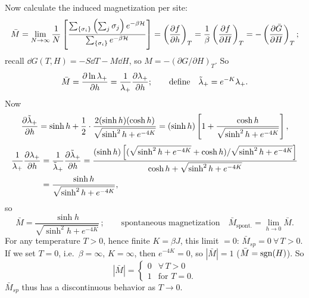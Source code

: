 Now calculate the induced magnetization per site:
\begin{equation}
  \bar M = \lim_{N\to\infty}\frac{1}{N}\left[\frac{\sum_{\{\sigma_i\}}\left(\sum_j\sigma_j\right)e^{-\beta\mathcal{H}}}{\sum_{\{\sigma_i\}}e^{-\beta\mathcal{H}}}\right]
  = \left(\frac{\partial f}{\partial h}\right)_T = \frac{1}{\beta}\left(\frac{\partial f}{\partial H}\right)_T = -\left(\frac{\partial \bar G}{\partial H}\right)_T ;
\end{equation}
recall $\dd G(T,H) = -S\dd T - M\dd H$, so $M = -(\partial G/\partial H)_T$. So
\begin{equation}
  \bar M = \frac{\partial \ln\lambda_+}{\partial h} = \frac{1}{\lambda_+}\frac{\partial \lambda_+}{\partial h};
  \qquad\text{define}\quad \tilde\lambda_+ = e^{-K}\lambda_+ .
\end{equation}
Now
\begin{equation}
  \frac{\partial \tilde\lambda_+}{\partial h} = \sinh h + \frac{1}{2}\cdot\frac{2(\sinh h)(\cosh h)}{\sqrt{\sinh^2h+e^{-4K}}}
  = (\sinh h)\left[1 + \frac{\cosh h}{\sqrt{\sinh^2h+e^{-4K}}}\right],
\end{equation}
\begin{align}
  \frac{1}{\lambda_+}\frac{\partial \lambda_+}{\partial h} &= \frac{1}{\tilde\lambda_+}\frac{\partial \tilde\lambda_+}{\partial h}
  = \frac{(\sinh h)\left[(\sqrt{\sinh^2h+e^{-4K}}+\cosh h)/\sqrt{\sinh^2h+e^{-4K}}\right]}{\cosh h+\sqrt{\sinh^2h+e^{-4K}}}\nonumber\\
  &= \frac{\sinh h}{\sqrt{\sinh^2h+e^{-4K}}},
\end{align}
so
\begin{equation}
  \boxed{\bar M = \frac{\sinh h}{\sqrt{\sinh^2h+e^{-4K}}}}\,;
  \qquad\text{spontaneous magnetization}\quad \bar M_{\text{spont.}} = \lim_{h\to 0}\bar M .
\end{equation}
For any temperature $T>0$, hence finite $K = \beta J$, this limit $=0$:
$\bar M_{sp} = 0\ \forall\, T>0$. If we set $T = 0$, i.e.\ $\beta = \infty$, $K = \infty$, then
$e^{-4K} = 0$, so $|\bar M| = 1$ ($\bar M = \operatorname{sgn}(H)$). So
\begin{equation}
  |\bar M| = \begin{cases} 0 & \forall\, T>0\\ 1 & \text{for } T = 0.\end{cases}
\end{equation}
$\bar M_{sp}$ thus has a discontinuous behavior as $T\to 0$.

